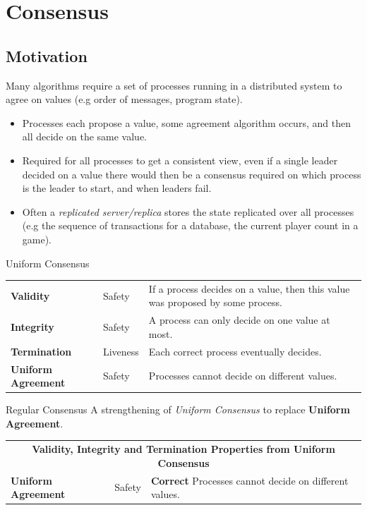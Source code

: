 \chapter{Consensus}
\section{Motivation}
Many algorithms require a set of processes running in a distributed system to agree on values (e.g order of messages, program state).
\begin{itemize}
    \item Processes each propose a value, some agreement algorithm occurs, and then all decide on the same value.
    \item Required for all processes to get a consistent view, even if a single leader decided on a value there would then be a consensus required on which process is the leader to start, and when leaders fail.
    \item Often a \textit{replicated server/replica} stores the state replicated over all processes (e.g the sequence of transactions for a database, the current player count in a game).
\end{itemize}

\begin{definitionbox}{Uniform Consensus}
    \begin{center}
        \begin{tabular}{l l p{}}
            \textbf{Validity} & Safety & If a process decides on a value, then this value was proposed by some process. \\
            \textbf{Integrity} & Safety & A process can only decide on one value at most. \\
            \textbf{Termination} & Liveness & Each correct process eventually decides. \\
            \textbf{Uniform Agreement} & Safety & Processes cannot decide on different values. \\
        \end{tabular}
    \end{center}
\end{definitionbox}

\begin{definitionbox}{Regular Consensus}
    A strengthening of \textit{Uniform Consensus} to replace \textbf{Uniform Agreement}.
    \begin{center}
        \begin{tabular}{l l p{}}
            \multicolumn{3}{c}{\textbf{Validity, Integrity and Termination Properties from Uniform Consensus}} \\
            \textbf{Uniform Agreement} & Safety & \textbf{Correct} Processes cannot decide on different values. \\
        \end{tabular}
    \end{center}
\end{definitionbox}

